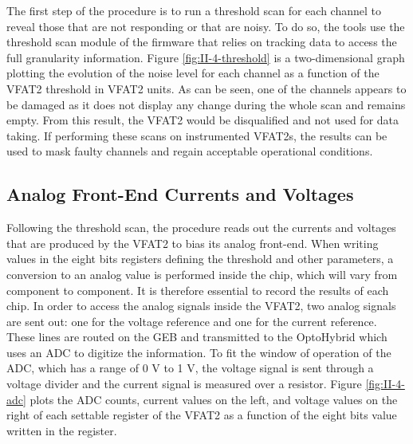       The first step of the procedure is to run a threshold scan for each channel to reveal those that are not responding or that are noisy. To do so, the tools use the threshold scan module of the firmware that relies on tracking data to access the full granularity information. Figure \ref{fig:II-4-threshold} is a two-dimensional graph plotting the evolution of the noise level for each channel as a function of the VFAT2 threshold in VFAT2 units. As can be seen, one of the channels appears to be damaged as it does not display any change during the whole scan and remains empty. From this result, the VFAT2 would be disqualified and not used for data taking. If performing these scans on instrumented VFAT2s, the results can be used to mask faulty channels and regain acceptable operational conditions.

    \subsection{Analog Front-End Currents and Voltages}

      Following the threshold scan, the procedure reads out the currents and voltages that are produced by the VFAT2 to bias its analog front-end. When writing values in the eight bits registers defining the threshold and other parameters, a conversion to an analog value is performed inside the chip, which will vary from component to component. It is therefore essential to record the results of each chip. In order to access the analog signals inside the VFAT2, two analog signals are sent out: one for the voltage reference and one for the current reference. These lines are routed on the GEB and transmitted to the OptoHybrid which uses an ADC to digitize the information. To fit the window of operation of the ADC, which has a range of 0 V to 1 V, the voltage signal is sent through a voltage divider and the current signal is measured over a resistor. Figure \ref{fig:II-4-adc} plots the ADC counts, current values on the left, and voltage values on the right of each settable register of the VFAT2 as a function of the eight bits value written in the register. \\

